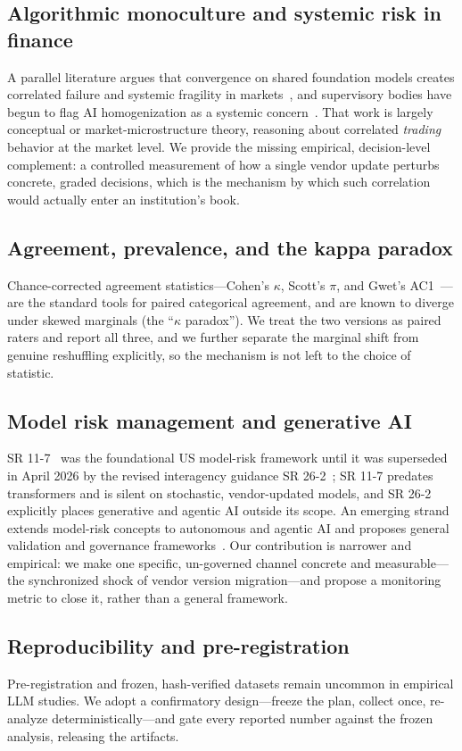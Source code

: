 \documentclass[10pt,twocolumn]{article}
\begin{document}
\subsection{Algorithmic monoculture and systemic risk in finance}
A parallel literature argues that convergence on shared foundation models creates correlated failure and systemic fragility in markets~\cite{kim,systemic,homog}, and supervisory bodies have begun to flag AI homogenization as a systemic concern~\cite{esrb}. That work is largely conceptual or market-microstructure theory, reasoning about correlated \emph{trading} behavior at the market level. We provide the missing empirical, decision-level complement: a controlled measurement of how a single vendor update perturbs concrete, graded decisions, which is the mechanism by which such correlation would actually enter an institution's book.

\subsection{Agreement, prevalence, and the kappa paradox}
Chance-corrected agreement statistics---Cohen's $\kappa$, Scott's $\pi$, and Gwet's AC1~\cite{gwet}---are the standard tools for paired categorical agreement, and are known to diverge under skewed marginals (the ``$\kappa$ paradox''). We treat the two versions as paired raters and report all three, and we further separate the marginal shift from genuine reshuffling explicitly, so the mechanism is not left to the choice of statistic.

\subsection{Model risk management and generative AI}
SR 11-7~\cite{sr117} was the foundational US model-risk framework until it was superseded in April 2026 by the revised interagency guidance SR 26-2~\cite{sr2602}; SR 11-7 predates transformers and is silent on stochastic, vendor-updated models, and SR 26-2 explicitly places generative and agentic AI outside its scope. An emerging strand extends model-risk concepts to autonomous and agentic AI and proposes general validation and governance frameworks~\cite{mrm}. Our contribution is narrower and empirical: we make one specific, un-governed channel concrete and measurable---the synchronized shock of vendor version migration---and propose a monitoring metric to close it, rather than a general framework.

\subsection{Reproducibility and pre-registration}
Pre-registration and frozen, hash-verified datasets remain uncommon in empirical LLM studies. We adopt a confirmatory design---freeze the plan, collect once, re-analyze deterministically---and gate every reported number against the frozen analysis, releasing the artifacts.
\end{document}

